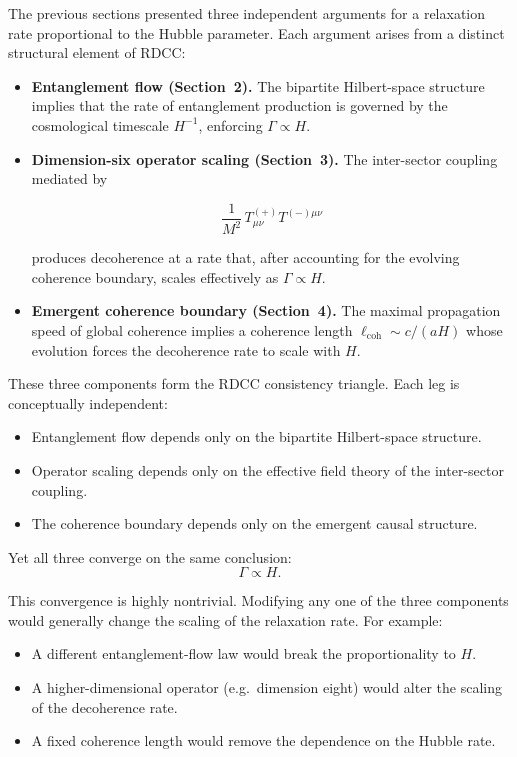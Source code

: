 \documentclass[11pt,a4paper]{article}
\begin{document}
The previous sections presented three independent arguments for a relaxation rate
proportional to the Hubble parameter. Each argument arises from a distinct structural
element of RDCC:

\begin{itemize}
    \item \textbf{Entanglement flow (Section~2).}  
    The bipartite Hilbert-space structure implies that the rate of entanglement
    production is governed by the cosmological timescale $H^{-1}$, enforcing
    $\Gamma \propto H$.

    \item \textbf{Dimension-six operator scaling (Section~3).}  
    The inter-sector coupling mediated by
    

\[
        \frac{1}{M^{2}}\, T^{(+)}_{\mu\nu} T^{(-)\mu\nu}
    \]


    produces decoherence at a rate that, after accounting for the evolving coherence
    boundary, scales effectively as $\Gamma \propto H$.

    \item \textbf{Emergent coherence boundary (Section~4).}  
    The maximal propagation speed of global coherence implies a coherence length
    $\ell_{\mathrm{coh}} \sim c/(aH)$ whose evolution forces the decoherence rate to scale
    with $H$.
\end{itemize}

These three components form the RDCC consistency triangle. Each leg is conceptually
independent:

\begin{itemize}
    \item Entanglement flow depends only on the bipartite Hilbert-space structure.
    \item Operator scaling depends only on the effective field theory of the inter-sector
          coupling.
    \item The coherence boundary depends only on the emergent causal structure.
\end{itemize}

Yet all three converge on the same conclusion:
\begin{equation}
    \Gamma \propto H.
\end{equation}

This convergence is highly nontrivial. Modifying any one of the three components would
generally change the scaling of the relaxation rate. For example:

\begin{itemize}
    \item A different entanglement-flow law would break the proportionality to $H$.
    \item A higher-dimensional operator (e.g.\ dimension eight) would alter the scaling of
          the decoherence rate.
    \item A fixed coherence length would remove the dependence on the Hubble rate.
\end{itemize}
\end{document}
